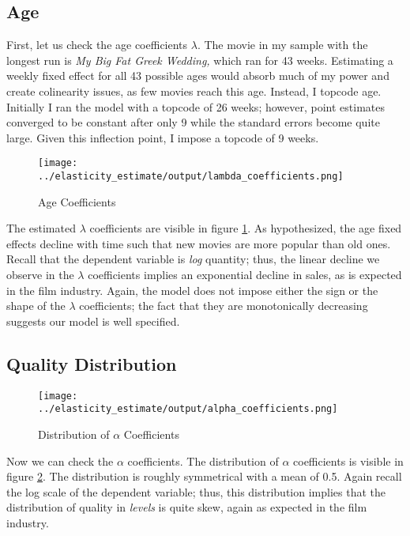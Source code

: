 \documentclass{article}
\begin{document}
\subsection{Age}

First, let us check the age coefficients $\lambda$. The movie in my sample with the longest run is \emph{My Big Fat Greek Wedding,} which ran for 43 weeks. Estimating a weekly fixed effect for all 43 possible ages would absorb much of my power and create colinearity issues, as few movies reach this age. Instead, I topcode age. Initially I ran the model with a topcode of 26 weeks; however, point estimates converged to be constant after only 9 while the standard errors become quite large. Given this inflection point, I impose a topcode of 9 weeks.

\begin{center}
    \begin{figure}
        \texttt{[image: ../elasticity\_estimate/output/lambda\_coefficients.png]}
        \caption{Age Coefficients}
        \label{fig:age_coefs}
    \end{figure}
\end{center}

The estimated $\lambda$ coefficients are visible in figure \ref{fig:age_coefs}. As hypothesized, the age fixed effects decline with time such that new movies are more popular than old ones. Recall that the dependent variable is \emph{log} quantity; thus, the linear decline we observe in the $\lambda$ coefficients implies an exponential decline in sales, as is expected in the film industry. Again, the model does not impose either the sign or the shape of the $\lambda$ coefficients; the fact that they are monotonically decreasing suggests our model is well specified.

\subsection{Quality Distribution}

\begin{center}
    \begin{figure}
        \texttt{[image: ../elasticity\_estimate/output/alpha\_coefficients.png]}
        \caption{Distribution of $\alpha$ Coefficients}
        \label{fig:alpha_dist}
    \end{figure}
\end{center}

Now we can check the $\alpha$ coefficients. The distribution of $\alpha$ coefficients is visible in figure \ref{fig:alpha_dist}. The distribution is roughly symmetrical with a mean of 0.5. Again recall the log scale of the dependent variable; thus, this distribution implies that the distribution of quality in \emph{levels} is quite skew, again as expected in the film industry. 
\end{document}
